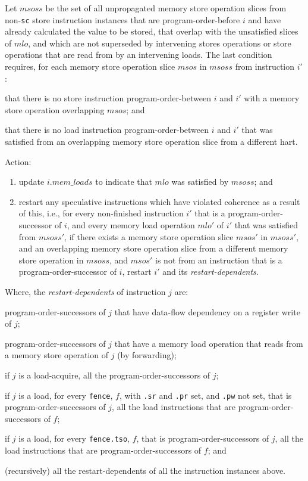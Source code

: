 Let $msoss$ be the set of all unpropagated memory store operation slices from non-{\tt sc} store instruction instances that are program-order-before $i$ and have already calculated the value to be stored, that overlap with the unsatisfied slices of $mlo$, and which are not superseded by intervening stores operations or store operations that are read from by an intervening loads.
The last condition requires, for each memory store operation slice $msos$ in $msoss$ from instruction $i'$:
\begin{tightlist}
\item that there is no store instruction program-order-between $i$ and $i'$ with a memory store operation overlapping $msos$; and
\item that there is no load instruction program-order-between $i$ and $i'$ that was satisfied from an overlapping memory store operation slice from a different hart.
\end{tightlist}

Action:
\begin{enumerate}
\item update $i.\textit{mem\_loads}$ to indicate that $mlo$ was satisfied by $msoss$; and
\item restart any speculative instructions which have violated coherence as a result of this, i.e., for every non-finished instruction $i'$ that is a program-order-successor of $i$, and every memory load operation $mlo'$ of $i'$ that was satisfied from $msoss'$, if there exists a memory store operation slice $msos'$ in $msoss'$, and an overlapping memory store operation slice from a different memory store operation in $msoss$, and $msos'$ is not from an instruction that is a program-order-successor of $i$, restart $i'$ and its {\em restart-dependents}.
\end{enumerate}
Where, the {\em restart-dependents} of instruction $j$ are:
\begin{tightlist}
\item program-order-successors of $j$ that have data-flow dependency on a register write of $j$;
\item program-order-successors of $j$ that have a memory load operation that reads from a memory store operation of $j$ (by forwarding);
\item if $j$ is a load-acquire, all the program-order-successors of $j$;
\item if $j$ is a load, for every {\tt fence}, $f$, with {\tt .sr} and {\tt .pr} set, and {\tt .pw} not set, that is program-order-successors of $j$, all the load instructions that are program-order-successors of $f$;
\item if $j$ is a load, for every {\tt fence.tso}, $f$, that is program-order-successors of $j$, all the load instructions that are program-order-successors of $f$;
and \item (recursively) all the restart-dependents of all the instruction instances above.
\end{tightlist}

